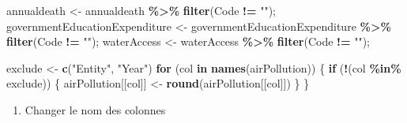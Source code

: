 \documentclass[
]{article}
\newenvironment{Shaded}{\begin{snugshade}}{\end{snugshade}}
\newcommand{\ControlFlowTok}[1]{\textcolor[rgb]{0.13,0.29,0.53}{\textbf{#1}}}
\newcommand{\FunctionTok}[1]{\textcolor[rgb]{0.13,0.29,0.53}{\textbf{#1}}}
\newcommand{\NormalTok}[1]{#1}
\newcommand{\OtherTok}[1]{\textcolor[rgb]{0.56,0.35,0.01}{#1}}
\newcommand{\SpecialCharTok}[1]{\textcolor[rgb]{0.81,0.36,0.00}{\textbf{#1}}}
\newcommand{\StringTok}[1]{\textcolor[rgb]{0.31,0.60,0.02}{#1}}
\providecommand{\tightlist}{%
  \setlength{\itemsep}{0pt}\setlength{\parskip}{0pt}}
\begin{document}
\begin{Shaded}
\begin{Highlighting}[]
\NormalTok{annualdeath }\OtherTok{\textless{}{-}}\NormalTok{ annualdeath }\SpecialCharTok{\%\textgreater{}\%} \FunctionTok{filter}\NormalTok{(Code }\SpecialCharTok{!=} \StringTok{""}\NormalTok{);}
\NormalTok{governmentEducationExpenditure }\OtherTok{\textless{}{-}}\NormalTok{ governmentEducationExpenditure  }\SpecialCharTok{\%\textgreater{}\%} \FunctionTok{filter}\NormalTok{(Code }\SpecialCharTok{!=} \StringTok{""}\NormalTok{);}
\NormalTok{waterAccess }\OtherTok{\textless{}{-}}\NormalTok{ waterAccess }\SpecialCharTok{\%\textgreater{}\%} \FunctionTok{filter}\NormalTok{(Code }\SpecialCharTok{!=} \StringTok{""}\NormalTok{);}

\NormalTok{exclude }\OtherTok{\textless{}{-}}  \FunctionTok{c}\NormalTok{(}\StringTok{"Entity"}\NormalTok{, }\StringTok{"Year"}\NormalTok{)}
\ControlFlowTok{for}\NormalTok{ (col }\ControlFlowTok{in} \FunctionTok{names}\NormalTok{(airPollution)) \{}
  \ControlFlowTok{if}\NormalTok{ (}\SpecialCharTok{!}\NormalTok{(col }\SpecialCharTok{\%in\%}\NormalTok{ exclude)) \{}
\NormalTok{    airPollution[[col]] }\OtherTok{\textless{}{-}} \FunctionTok{round}\NormalTok{(airPollution[[col]])}
\NormalTok{  \}}
\NormalTok{\}}
\end{Highlighting}
\end{Shaded}

\begin{enumerate}
\def\labelenumi{\alph{enumi})}
\setcounter{enumi}{2}
\tightlist
\item
  Changer le nom des colonnes
\end{enumerate}
\end{document}
